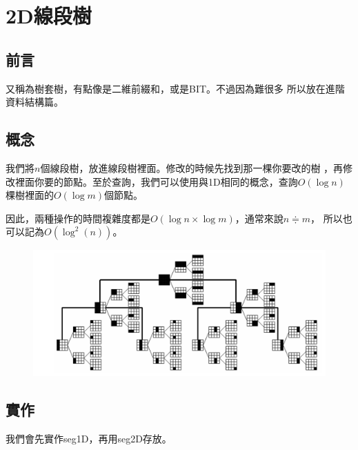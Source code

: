 \section{2D線段樹}
    \subsection{前言}
    又稱為樹套樹，有點像是二維前綴和，或是BIT。不過因為難很多
    所以放在進階資料結構篇。

    \subsection{概念}
    我們將$n$個線段樹，放進線段樹裡面。修改的時候先找到那一棵你要改的樹
    ，再修改裡面你要的節點。至於查詢，我們可以使用與1D相同的概念，查詢$O(\log n)$
    棵樹裡面的$O(\log m)$個節點。

    因此，兩種操作的時間複雜度都是$O(\log n \times \log m)$，通常來說$n \doteqdot m$，
    所以也可以記為$O(\log^{2}{(n)})$。

    \begin{figure}[ht]
        \centering
        \includegraphics[width=\textwidth]{../Images/2DSeg1.png}
    \end{figure}

    \subsection{實作}
    我們會先實作seg1D，再用seg2D存放。

